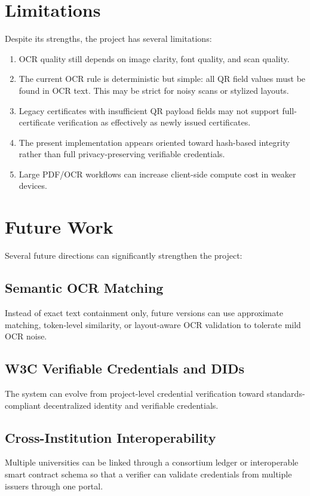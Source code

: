 \documentclass[12pt,a4paper]{article}
\begin{document}
\section{Limitations}
Despite its strengths, the project has several limitations:
\begin{enumerate}[leftmargin=1.5em]
\item OCR quality still depends on image clarity, font quality, and scan quality.
\item The current OCR rule is deterministic but simple: all QR field values must be found in OCR text. This may be strict for noisy scans or stylized layouts.
\item Legacy certificates with insufficient QR payload fields may not support full-certificate verification as effectively as newly issued certificates.
\item The present implementation appears oriented toward hash-based integrity rather than full privacy-preserving verifiable credentials.
\item Large PDF/OCR workflows can increase client-side compute cost in weaker devices.
\end{enumerate}

\section{Future Work}
Several future directions can significantly strengthen the project:

\subsection{Semantic OCR Matching}
Instead of exact text containment only, future versions can use approximate matching, token-level similarity, or layout-aware OCR validation to tolerate mild OCR noise.

\subsection{W3C Verifiable Credentials and DIDs}
The system can evolve from project-level credential verification toward standards-compliant decentralized identity and verifiable credentials.

\subsection{Cross-Institution Interoperability}
Multiple universities can be linked through a consortium ledger or interoperable smart contract schema so that a verifier can validate credentials from multiple issuers through one portal.
\end{document}
